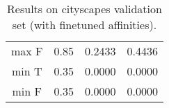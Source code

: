 \begin{table}
\begin{subtable}[t!]{0.5\textwidth}
\begin{tabular}{c| c| c | c }
max F & 0.85 & {\color{Red} 0.2433 } & {\color{Red} 0.4436 } \\
min T & 0.35  & {\color{Red} 0.0000 } & {\color{Red} 0.0000 } \\
min F & 0.35  & {\color{Red} 0.0000 } & {\color{Red} 0.0000 } \\


        \end{tabular}
    \end{subtable} 
    \caption{Results on cityscapes validation set (with finetuned affinities). }
    \label{tab:linkage-criteria}
\end{table}


